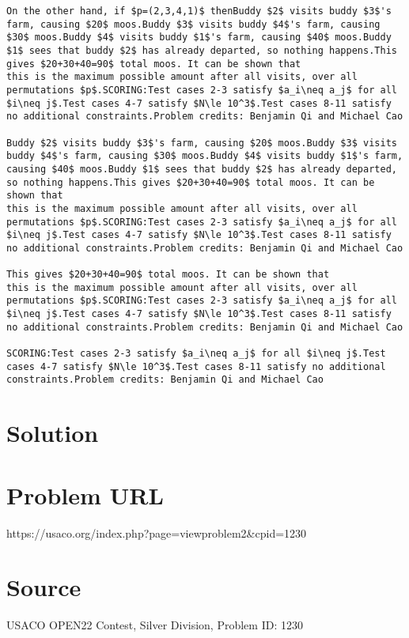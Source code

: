\documentclass[12pt]{article}
\begin{document}
\begin{verbatim}
On the other hand, if $p=(2,3,4,1)$ thenBuddy $2$ visits buddy $3$'s farm, causing $20$ moos.Buddy $3$ visits buddy $4$'s farm, causing $30$ moos.Buddy $4$ visits buddy $1$'s farm, causing $40$ moos.Buddy $1$ sees that buddy $2$ has already departed, so nothing happens.This gives $20+30+40=90$ total moos. It can be shown that
this is the maximum possible amount after all visits, over all
permutations $p$.SCORING:Test cases 2-3 satisfy $a_i\neq a_j$ for all $i\neq j$.Test cases 4-7 satisfy $N\le 10^3$.Test cases 8-11 satisfy no additional constraints.Problem credits: Benjamin Qi and Michael Cao

Buddy $2$ visits buddy $3$'s farm, causing $20$ moos.Buddy $3$ visits buddy $4$'s farm, causing $30$ moos.Buddy $4$ visits buddy $1$'s farm, causing $40$ moos.Buddy $1$ sees that buddy $2$ has already departed, so nothing happens.This gives $20+30+40=90$ total moos. It can be shown that
this is the maximum possible amount after all visits, over all
permutations $p$.SCORING:Test cases 2-3 satisfy $a_i\neq a_j$ for all $i\neq j$.Test cases 4-7 satisfy $N\le 10^3$.Test cases 8-11 satisfy no additional constraints.Problem credits: Benjamin Qi and Michael Cao

This gives $20+30+40=90$ total moos. It can be shown that
this is the maximum possible amount after all visits, over all
permutations $p$.SCORING:Test cases 2-3 satisfy $a_i\neq a_j$ for all $i\neq j$.Test cases 4-7 satisfy $N\le 10^3$.Test cases 8-11 satisfy no additional constraints.Problem credits: Benjamin Qi and Michael Cao

SCORING:Test cases 2-3 satisfy $a_i\neq a_j$ for all $i\neq j$.Test cases 4-7 satisfy $N\le 10^3$.Test cases 8-11 satisfy no additional constraints.Problem credits: Benjamin Qi and Michael Cao
\end{verbatim}

\section*{Solution}


\section*{Problem URL}
https://usaco.org/index.php?page=viewproblem2&cpid=1230

\section*{Source}
USACO OPEN22 Contest, Silver Division, Problem ID: 1230
\end{document}
